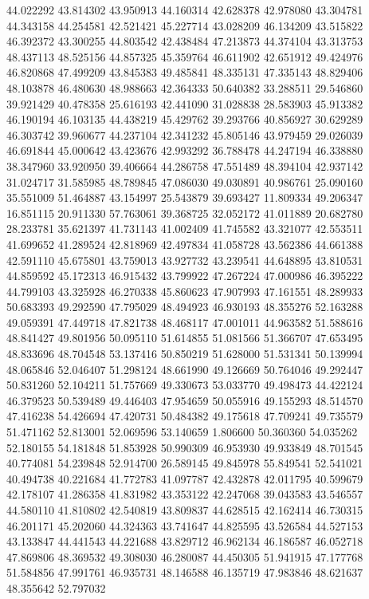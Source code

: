 44.022292
43.814302
43.950913
44.160314
42.628378
42.978080
43.304781
44.343158
44.254581
42.521421
45.227714
43.028209
46.134209
43.515822
46.392372
43.300255
44.803542
42.438484
47.213873
44.374104
43.313753
48.437113
48.525156
44.857325
45.359764
46.611902
42.651912
49.424976
46.820868
47.499209
43.845383
49.485841
48.335131
47.335143
48.829406
48.103878
46.480630
48.988663
42.364333
50.640382
33.288511
29.546860
39.921429
40.478358
25.616193
42.441090
31.028838
28.583903
45.913382
46.190194
46.103135
44.438219
45.429762
39.293766
40.856927
30.629289
46.303742
39.960677
44.237104
42.341232
45.805146
43.979459
29.026039
46.691844
45.000642
43.423676
42.993292
36.788478
44.247194
46.338880
38.347960
33.920950
39.406664
44.286758
47.551489
48.394104
42.937142
31.024717
31.585985
48.789845
47.086030
49.030891
40.986761
25.090160
35.551009
51.464887
43.154997
25.543879
39.693427
11.809334
49.206347
16.851115
20.911330
57.763061
39.368725
32.052172
41.011889
20.682780
28.233781
35.621397
41.731143
41.002409
41.745582
43.321077
42.553511
41.699652
41.289524
42.818969
42.497834
41.058728
43.562386
44.661388
42.591110
45.675801
43.759013
43.927732
43.239541
44.648895
43.810531
44.859592
45.172313
46.915432
43.799922
47.267224
47.000986
46.395222
44.799103
43.325928
46.270338
45.860623
47.907993
47.161551
48.289933
50.683393
49.292590
47.795029
48.494923
46.930193
48.355276
52.163288
49.059391
47.449718
47.821738
48.468117
47.001011
44.963582
51.588616
48.841427
49.801956
50.095110
51.614855
51.081566
51.366707
47.653495
48.833696
48.704548
53.137416
50.850219
51.628000
51.531341
50.139994
48.065846
52.046407
51.298124
48.661990
49.126669
50.764046
49.292447
50.831260
52.104211
51.757669
49.330673
53.033770
49.498473
44.422124
46.379523
50.539489
49.446403
47.954659
50.055916
49.155293
48.514570
47.416238
54.426694
47.420731
50.484382
49.175618
47.709241
49.735579
51.471162
52.813001
52.069596
53.140659
1.806600
50.360360
54.035262
52.180155
54.181848
51.853928
50.990309
46.953930
49.933849
48.701545
40.774081
54.239848
52.914700
26.589145
49.845978
55.849541
52.541021
40.494738
40.221684
41.772783
41.097787
42.432878
42.011795
40.599679
42.178107
41.286358
41.831982
43.353122
42.247068
39.043583
43.546557
44.580110
41.810802
42.540819
43.809837
44.628515
42.162414
46.730315
46.201171
45.202060
44.324363
43.741647
44.825595
43.526584
44.527153
43.133847
44.441543
44.221688
43.829712
46.962134
46.186587
46.052718
47.869806
48.369532
49.308030
46.280087
44.450305
51.941915
47.177768
51.584856
47.991761
46.935731
48.146588
46.135719
47.983846
48.621637
48.355642
52.797032
